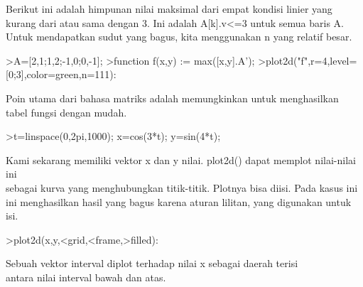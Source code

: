 \documentclass{article}
\begin{document}
\begin{eulernotebook}
\begin{eulercomment}
\begin{eulercomment}
\begin{eulercomment}
\begin{eulercomment}
\begin{eulercomment}
\begin{eulercomment}
\begin{eulercomment}
\begin{eulercomment}
\begin{eulercomment}
\begin{eulercomment}
\begin{eulercomment}
\begin{eulercomment}
\begin{eulercomment}
\begin{eulercomment}
\begin{eulercomment}
\begin{eulercomment}
\begin{eulercomment}
\begin{eulercomment}
\begin{eulercomment}
\begin{eulercomment}
\begin{eulercomment}
\begin{eulercomment}
\begin{eulercomment}
\begin{eulercomment}
\begin{eulercomment}
Berikut ini adalah himpunan nilai maksimal dari empat kondisi linier
yang kurang dari atau sama dengan 3. Ini adalah A[k].v\textless{}=3 untuk semua
baris A. Untuk mendapatkan sudut yang bagus, kita menggunakan n yang
relatif besar.
\end{eulercomment}
\begin{eulerprompt}
>A=[2,1;1,2;-1,0;0,-1];
>function f(x,y) := max([x,y].A');
>plot2d("f",r=4,level=[0;3],color=green,n=111):
\end{eulerprompt}
\begin{eulercomment}
Poin utama dari bahasa matriks adalah memungkinkan untuk menghasilkan
tabel fungsi dengan mudah.
\end{eulercomment}
\begin{eulerprompt}
>t=linspace(0,2pi,1000); x=cos(3*t); y=sin(4*t);
\end{eulerprompt}
\begin{eulercomment}
Kami sekarang memiliki vektor x dan y nilai. plot2d() dapat memplot
nilai-nilai ini\\
sebagai kurva yang menghubungkan titik-titik. Plotnya bisa diisi. Pada
kasus ini\\
ini menghasilkan hasil yang bagus karena aturan lilitan, yang
digunakan untuk\\
isi.
\end{eulercomment}
\begin{eulerprompt}
>plot2d(x,y,<grid,<frame,>filled):
\end{eulerprompt}
\begin{eulercomment}
Sebuah vektor interval diplot terhadap nilai x sebagai daerah terisi\\
antara nilai interval bawah dan atas.


\end{eulercomment}
\end{eulercomment}
\end{eulercomment}
\end{eulercomment}
\end{eulercomment}
\end{eulercomment}
\end{eulercomment}
\end{eulercomment}
\end{eulercomment}
\end{eulercomment}
\end{eulercomment}
\end{eulercomment}
\end{eulercomment}
\end{eulercomment}
\end{eulercomment}
\end{eulercomment}
\end{eulercomment}
\end{eulercomment}
\end{eulercomment}
\end{eulercomment}
\end{eulercomment}
\end{eulercomment}
\end{eulercomment}
\end{eulercomment}
\end{eulercomment}
\end{eulernotebook}
\end{document}
